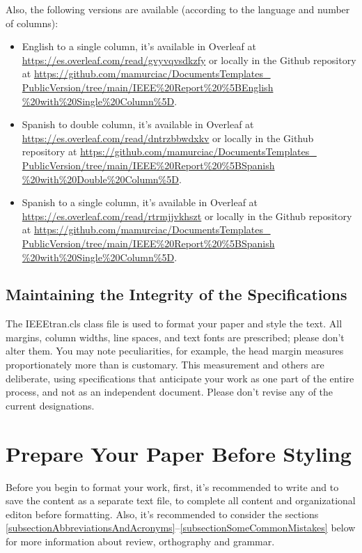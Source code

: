 \documentclass[letterpaper, 10pt, conference]{IEEEtran} %
\begin{document}
	Also, the following versions are available (according to the language and number of columns):
	\begin{itemize}
		\item English to a single column, it's available in Overleaf at \href{https://es.overleaf.com/read/gvyvqvsdkzfy}{https://es.overleaf.com/read/gvyvqvsdkzfy} or locally in the Github repository at \href{https://github.com/mamurciac/DocumentsTemplates_PublicVersion/tree/main/IEEE%20Report%20%5BEnglish%20with%20Single%20Column%5D}{https://github.com/mamurciac/DocumentsTemplates\_ PublicVersion/tree/main/IEEE\%20Report\%20\%5BEnglish \%20with\%20Single\%20Column\%5D}.
		\item Spanish to double column, it's available in Overleaf at \href{https://es.overleaf.com/read/dntrzbbwdxkv}{https://es.overleaf.com/read/dntrzbbwdxkv} or locally in the Github repository at \href{https://github.com/mamurciac/DocumentsTemplates_PublicVersion/tree/main/IEEE%20Report%20%5BSpanish%20with%20Double%20Column%5D}{https://github.com/mamurciac/DocumentsTemplates\_ PublicVersion/tree/main/IEEE\%20Report\%20\%5BSpanish \%20with\%20Double\%20Column\%5D}.
		\item Spanish to a single column, it's available in Overleaf at \href{https://es.overleaf.com/read/rtrmjjvkhszt}{https://es.overleaf.com/read/rtrmjjvkhszt} or locally in the Github repository at \href{https://github.com/mamurciac/DocumentsTemplates_PublicVersion/tree/main/IEEE%20Report%20%5BSpanish%20with%20Single%20Column%5D}{https://github.com/mamurciac/DocumentsTemplates\_ PublicVersion/tree/main/IEEE\%20Report\%20\%5BSpanish \%20with\%20Single\%20Column\%5D}.
	\end{itemize}
	
	\subsection{Maintaining the Integrity of the Specifications} \label{subsectionMaintainingTheIntegrityOfTheSpecifications}
	The IEEEtran.cls class file is used to format your paper and style the text. All margins, column widths, line spaces, and text fonts are prescribed; please don't alter them. You may note peculiarities, for example, the head margin measures proportionately more than is customary. This measurement and others are deliberate, using specifications that anticipate your work as one part of the entire process, and not as an independent document. Please don't revise any of the current designations.
	
	\section{Prepare Your Paper Before Styling} \label{sectionPrepareYourPaperBeforeStyling}
	Before you begin to format your work, first, it's recommended to write and to save the content as a separate text file, to complete all content and organizational editon before formatting. Also, it's recommended to consider the sections \ref{subsectionAbbreviationsAndAcronyms}--\ref{subsectionSomeCommonMistakes} below for more information about review, orthography and grammar.
	
\end{document}
